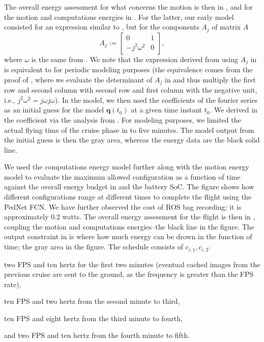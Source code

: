 The overall energy assessment for what concerns the motion is then in , and for the motion and computations energies in . For the latter, our early model consisted for an expression similar to , but for the components $A_j$ of matrix $A$
\begin{equation}\label{eq:alter-aj}
  A_j:=\begin{bmatrix}0 & 1 \\ -j^2\omega^2 & 0\end{bmatrix},
\end{equation}
where $\omega$ is the same from . We note that the expression derived from using $A_j$ in  is equivalent to  for periodic modeling purposes (the equivalence comes from the proof of , where we evaluate the determinant of $A_j$ in  and thus multiply the first row and second column with second row and first column with the negative unit, i.e., $j^2\omega^2=j\omega j\omega$). In the model, we then used the coefficients of the fourier series as an initial guess for the model $\mathbf{q}(t_0)$ at a given time instant $t_0$. We derived in the coefficient via the analysis from . For modeling purposes, we limited the actual flying time of the cruise phase in  to five minutes. The model output from the initial guess is then the gray area, whereas the energy data are the black solid line. 

We used the computations energy model further along with the motion energy model to evaluate the maximum allowed configuration as a function of time against the overall energy budget in  and the battery SoC. The figure shows how different configurations range at different times to complete the flight using the PedNet FCN. We have further observed the cost of ROS bag recording; it is approximately 0.2 watts.
The overall energy assessment for the flight is then in , coupling the motion and computations energies--the black line in the figure. The output constraint in  is where how much energy can be drown in the function of time; the gray area in the figure. The schedule consists of $c_{i,1},c_{i,2}$: 
\begin{enumerate*}[label={(\alph*)},font={\textit}]
  \item two FPS and ten hertz for the first two minutes (eventual cached images from the previous cruise are sent to the ground, as the frequency is greater than the FPS rate),
  \item ten FPS and two hertz from the second minute to third,
  \item ten FPS and eight hertz from the third minute to fourth, 
  \item and two FPS and ten hertz from the fourth minute to fifth.
\end{enumerate*}


